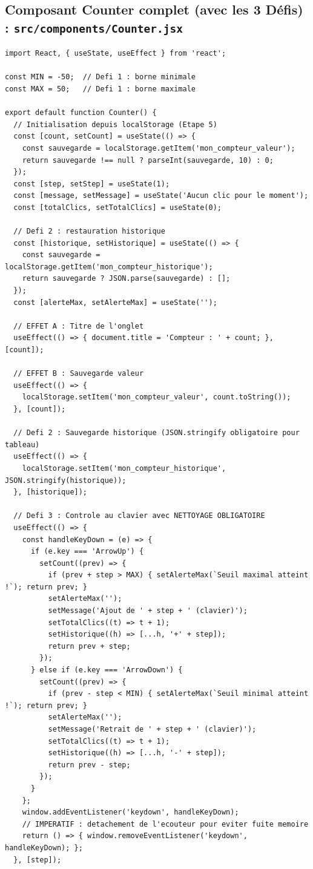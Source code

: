 \documentclass[12pt, a4paper]{article}
\begin{document}
\subsection{Composant Counter complet (avec les 3 Défis) : \texttt{src/components/Counter.jsx}}
\begin{lstlisting}
import React, { useState, useEffect } from 'react';

const MIN = -50;  // Defi 1 : borne minimale
const MAX = 50;   // Defi 1 : borne maximale

export default function Counter() {
  // Initialisation depuis localStorage (Etape 5)
  const [count, setCount] = useState(() => {
    const sauvegarde = localStorage.getItem('mon_compteur_valeur');
    return sauvegarde !== null ? parseInt(sauvegarde, 10) : 0;
  });
  const [step, setStep] = useState(1);
  const [message, setMessage] = useState('Aucun clic pour le moment');
  const [totalClics, setTotalClics] = useState(0);

  // Defi 2 : restauration historique
  const [historique, setHistorique] = useState(() => {
    const sauvegarde = localStorage.getItem('mon_compteur_historique');
    return sauvegarde ? JSON.parse(sauvegarde) : [];
  });
  const [alerteMax, setAlerteMax] = useState('');

  // EFFET A : Titre de l'onglet
  useEffect(() => { document.title = 'Compteur : ' + count; }, [count]);

  // EFFET B : Sauvegarde valeur
  useEffect(() => {
    localStorage.setItem('mon_compteur_valeur', count.toString());
  }, [count]);

  // Defi 2 : Sauvegarde historique (JSON.stringify obligatoire pour tableau)
  useEffect(() => {
    localStorage.setItem('mon_compteur_historique', JSON.stringify(historique));
  }, [historique]);

  // Defi 3 : Controle au clavier avec NETTOYAGE OBLIGATOIRE
  useEffect(() => {
    const handleKeyDown = (e) => {
      if (e.key === 'ArrowUp') {
        setCount((prev) => {
          if (prev + step > MAX) { setAlerteMax(`Seuil maximal atteint !`); return prev; }
          setAlerteMax('');
          setMessage('Ajout de ' + step + ' (clavier)');
          setTotalClics((t) => t + 1);
          setHistorique((h) => [...h, '+' + step]);
          return prev + step;
        });
      } else if (e.key === 'ArrowDown') {
        setCount((prev) => {
          if (prev - step < MIN) { setAlerteMax(`Seuil minimal atteint !`); return prev; }
          setAlerteMax('');
          setMessage('Retrait de ' + step + ' (clavier)');
          setTotalClics((t) => t + 1);
          setHistorique((h) => [...h, '-' + step]);
          return prev - step;
        });
      }
    };
    window.addEventListener('keydown', handleKeyDown);
    // IMPERATIF : detachement de l'ecouteur pour eviter fuite memoire
    return () => { window.removeEventListener('keydown', handleKeyDown); };
  }, [step]);


\end{lstlisting}
\end{document}
